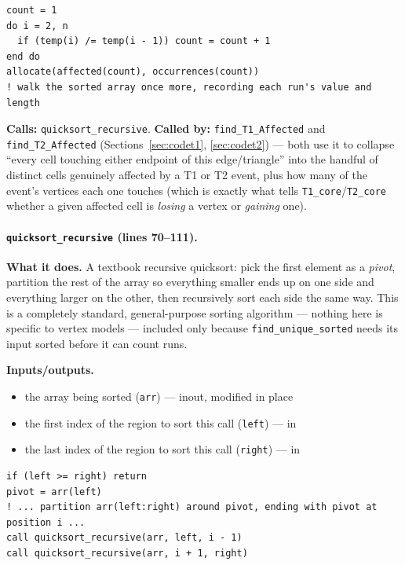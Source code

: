\documentclass[11pt]{article}
\begin{document}
\begin{lstlisting}[caption={The core counting pass of \texttt{find\_unique\_sorted}, after the input has already been sorted.}]
count = 1
do i = 2, n
  if (temp(i) /= temp(i - 1)) count = count + 1
end do
allocate(affected(count), occurrences(count))
! walk the sorted array once more, recording each run's value and length
\end{lstlisting}

\textbf{Calls:} \texttt{quicksort\_recursive}. \textbf{Called by:} \texttt{find\_T1\_Affected}
and \texttt{find\_T2\_Affected} (Sections~\ref{sec:codet1}, \ref{sec:codet2}) --- both use
it to collapse ``every cell touching either endpoint of this edge/triangle'' into the
handful of distinct cells genuinely affected by a T1 or T2 event, plus how many of the
event's vertices each one touches (which is exactly what tells \texttt{T1\_core}/\texttt{T2\_core}
whether a given affected cell is \emph{losing} a vertex or \emph{gaining} one).

\paragraph{\texttt{quicksort\_recursive} (lines 70--111).}
\textbf{What it does.} A textbook recursive quicksort: pick the first element as a
\emph{pivot}, partition the rest of the array so everything smaller ends up on one side
and everything larger on the other, then recursively sort each side the same way. This
is a completely standard, general-purpose sorting algorithm --- nothing here is
specific to vertex models --- included only because \texttt{find\_unique\_sorted} needs
its input sorted before it can count runs.

\textbf{Inputs/outputs.}
\begin{itemize}[nosep]
  \item the array being sorted (\texttt{arr}) --- inout, modified in place
  \item the first index of the region to sort this call (\texttt{left}) --- in
  \item the last index of the region to sort this call (\texttt{right}) --- in
\end{itemize}

\begin{lstlisting}[caption={The partition-and-recurse structure of \texttt{quicksort\_recursive}.}]
if (left >= right) return
pivot = arr(left)
! ... partition arr(left:right) around pivot, ending with pivot at position i ...
call quicksort_recursive(arr, left, i - 1)
call quicksort_recursive(arr, i + 1, right)
\end{lstlisting}
\end{document}
